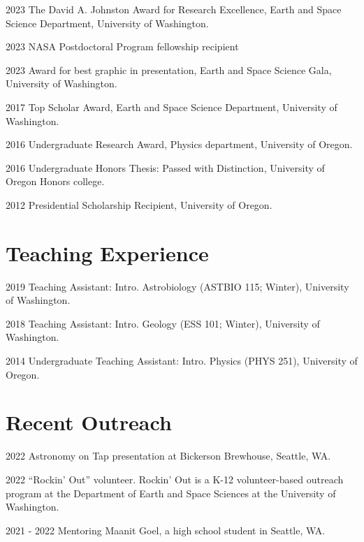 \documentclass{article}
\begin{document}
\begin{cvlist}
\item[2023]
  The David A. Johnston Award for Research Excellence, Earth and Space Science Department, University of Washington.
\item[2023] 
  NASA Postdoctoral Program fellowship recipient
\item[2023]
  Award for best graphic in presentation, Earth and Space Science Gala, University of Washington.
\item[2017]
  Top Scholar Award, Earth and Space Science Department, University of Washington.
\item[2016]
  Undergraduate Research Award, Physics department, University of Oregon.
\item[2016]
  Undergraduate Honors Thesis: Passed with Distinction, University of Oregon Honors college.
\item[2012]
  Presidential Scholarship Recipient, University of Oregon.
\end{cvlist}

\section{Teaching Experience}

\begin{cvlist}
\item[2019]
  Teaching Assistant: Intro. Astrobiology (ASTBIO 115; Winter), University of Washington.
\item[2018]
  Teaching Assistant: Intro. Geology (ESS 101; Winter), University of Washington.
\item[2014]
  Undergraduate Teaching Assistant: Intro. Physics (PHYS 251), University of Oregon.
\end{cvlist}

\section{Recent Outreach}

\begin{cvlist}
\item[2022]
  Astronomy on Tap presentation at Bickerson Brewhouse, Seattle, WA.
\item[2022]
  ``Rockin' Out'' volunteer. Rockin' Out is a K-12 volunteer-based outreach program at the Department of Earth and Space Sciences at the University of Washington.
\item[2021 - 2022]
  Mentoring Maanit Goel, a high school student in Seattle, WA.
\end{cvlist}
\end{document}
